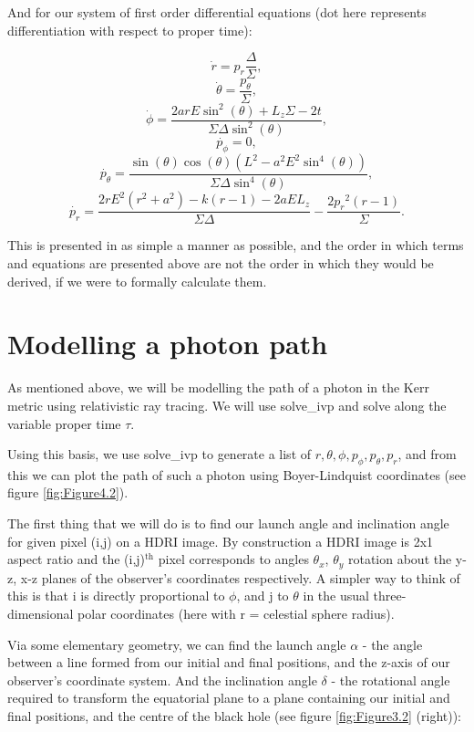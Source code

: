 \documentclass[oneside,openright,frontopenright, singlespacing]{dmathesis}
\begin{document}
	And for our system of first order differential equations (dot here represents differentiation with respect to proper time):

	\[\dot{r} = p_r\frac{\Delta}{\Sigma},\]
	\[\dot{\theta} = \frac{p_\theta}{\Sigma},\]
	\[\dot{\phi} = \frac{2arE\sin^2(\theta)+L_{z}\Sigma-2t}{\Sigma\Delta\sin^2(\theta)},\]
	\[\dot{p_{\phi}} = 0,\]
	\[\dot{p_{\theta}} = \frac{\sin(\theta)\cos(\theta)(L^2-a^2E^2\sin^4(\theta))}{\Sigma\Delta\sin^4(\theta)},\]
	\[\dot{p_{r}} = \frac{2rE^2(r^2+a^2)-k(r-1)-2aEL_{z}}{\Sigma\Delta}-\frac{2{p_{r}}^2(r-1)}{\Sigma}.\]

	This is presented in as simple a manner as possible, and the order in which terms and equations are presented above are not the order in which they would be derived, if we were to formally calculate them.
	

\section{Modelling a photon path}\label{sec:Section4.6}

	As mentioned above, we will be modelling the path of a photon in the Kerr metric using relativistic ray tracing. We will use solve\_ivp and solve along the variable proper time $\tau$.

\vspace{1em}
	Using this basis, we use solve\_ivp to generate a list of $r, \theta, \phi, p_{\phi}, p_{\theta}, p_{r}$, and from this we can plot the path of such a photon using Boyer-Lindquist coordinates (see figure \ref{fig:Figure4.2}).

\vspace{1em}
	The first thing that we will do is to find our launch angle and inclination angle for given pixel (i,j) on a HDRI image. By construction a HDRI image is 2x1 aspect ratio and the (i,j)$^{\mbox{th}}$ pixel corresponds to angles $\theta_x$, $\theta_y$ rotation about the y-z, x-z planes of the observer's coordinates respectively. A simpler way to think of this is that i is directly proportional to $\phi$, and j to $\theta$ in the usual three-dimensional polar coordinates (here with r = celestial sphere radius).

\vspace{1em}
	Via some elementary geometry, we can find the launch angle $\alpha$ - the angle between a line formed from our initial and final positions, and the z-axis of our observer's coordinate system. And the inclination angle $\delta$ - the rotational angle required to transform the equatorial plane to a plane containing our initial and final positions, and the centre of the black hole (see figure \ref{fig:Figure3.2} (right)):
\end{document}
